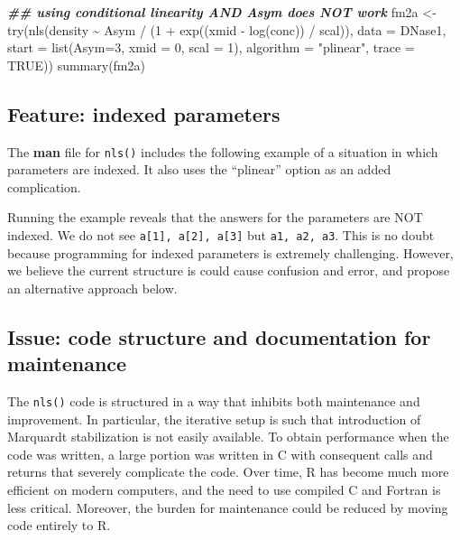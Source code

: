 \documentclass[
]{article}
\newenvironment{Shaded}{\begin{snugshade}}{\end{snugshade}}
\newcommand{\AttributeTok}[1]{\textcolor[rgb]{0.77,0.63,0.00}{#1}}
\newcommand{\ConstantTok}[1]{\textcolor[rgb]{0.00,0.00,0.00}{#1}}
\newcommand{\DecValTok}[1]{\textcolor[rgb]{0.00,0.00,0.81}{#1}}
\newcommand{\DocumentationTok}[1]{\textcolor[rgb]{0.56,0.35,0.01}{\textbf{\textit{#1}}}}
\newcommand{\FunctionTok}[1]{\textcolor[rgb]{0.00,0.00,0.00}{#1}}
\newcommand{\NormalTok}[1]{#1}
\newcommand{\OtherTok}[1]{\textcolor[rgb]{0.56,0.35,0.01}{#1}}
\newcommand{\SpecialCharTok}[1]{\textcolor[rgb]{0.00,0.00,0.00}{#1}}
\newcommand{\StringTok}[1]{\textcolor[rgb]{0.31,0.60,0.02}{#1}}
\begin{document}
\begin{Shaded}
\begin{Highlighting}[]
\DocumentationTok{\#\# using conditional linearity AND Asym does NOT work}
\NormalTok{fm2a }\OtherTok{\textless{}{-}} \FunctionTok{try}\NormalTok{(}\FunctionTok{nls}\NormalTok{(density }\SpecialCharTok{\textasciitilde{}}\NormalTok{ Asym }\SpecialCharTok{/}\NormalTok{ (}\DecValTok{1} \SpecialCharTok{+} \FunctionTok{exp}\NormalTok{((xmid }\SpecialCharTok{{-}} \FunctionTok{log}\NormalTok{(conc)) }\SpecialCharTok{/}\NormalTok{ scal)), }
                 \AttributeTok{data =}\NormalTok{ DNase1, }\AttributeTok{start =} \FunctionTok{list}\NormalTok{(}\AttributeTok{Asym=}\DecValTok{3}\NormalTok{, }\AttributeTok{xmid =} \DecValTok{0}\NormalTok{, }\AttributeTok{scal =} \DecValTok{1}\NormalTok{),}
                 \AttributeTok{algorithm =} \StringTok{"plinear"}\NormalTok{, }\AttributeTok{trace =} \ConstantTok{TRUE}\NormalTok{))}
\FunctionTok{summary}\NormalTok{(fm2a)}
\end{Highlighting}
\end{Shaded}

\hypertarget{feature-indexed-parameters}{%
\subsection{Feature: indexed
parameters}\label{feature-indexed-parameters}}

The \textbf{man} file for \texttt{nls()} includes the following example
of a situation in which parameters are indexed. It also uses the
``plinear'' option as an added complication.

Running the example reveals that the answers for the parameters are NOT
indexed. We do not see \texttt{a{[}1{]},\ a{[}2{]},\ a{[}3{]}} but
\texttt{a1,\ a2,\ a3}. This is no doubt because programming for indexed
parameters is extremely challenging. However, we believe the current
structure is could cause confusion and error, and propose an alternative
approach below.

\hypertarget{issue-code-structure-and-documentation-for-maintenance}{%
\subsection{Issue: code structure and documentation for
maintenance}\label{issue-code-structure-and-documentation-for-maintenance}}

The \texttt{nls()} code is structured in a way that inhibits both
maintenance and improvement. In particular, the iterative setup is such
that introduction of Marquardt stabilization is not easily available. To
obtain performance when the code was written, a large portion was
written in C with consequent calls and returns that severely complicate
the code. Over time, R has become much more efficient on modern
computers, and the need to use compiled C and Fortran is less critical.
Moreover, the burden for maintenance could be reduced by moving code
entirely to R.
\end{document}

